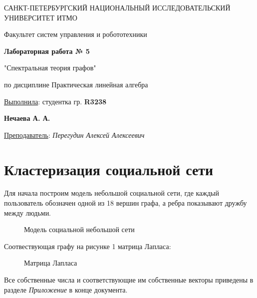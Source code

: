 \documentclass[a5paper, 10pt]{article}
\theoremstyle{definition}
\theoremstyle{plain}
\theoremstyle{remark}
\newcommand*{\titlePage}{
	\thispagestyle{title}
	\begingroup
	\begin{center}
		\vspace*{6ex}
		
		{\small
			САНКТ-ПЕТЕРБУРГСКИЙ НАЦИОНАЛЬНЫЙ ИССЛЕДОВАТЕЛЬСКИЙ УНИВЕРСИТЕТ ИТМО	
		}
		
		\vspace*{2ex}
		
		{\normalsize
			Факультет систем управления и робототехники
		}
		
		\vspace*{15ex}
		
		{\Large \bfseries 
			Лабораторная работа № 5
		}
\vspace*{2ex}
	{\Large \bfseries 
			
"Спектральная теория графов"
		}
\vspace*{2ex}
		
		{\normalsize
			по дисциплине Практическая линейная алгебра
		}

	\end{center}
	\vspace*{20ex}
	\begin{flushright}
		{\large 
			\underline{Выполнила}: студентка гр. \textbf{R3238}\\
			\begin{flushright}
				\textbf{Нечаева А. А.}\\
			\end{flushright}
		}
		
		\vspace*{5ex}
		
		{\large 
			\underline{Преподаватель}: \textit{Перегудин Алексей Алексеевич}
		}
	\end{flushright}	
	\newpage
	\setcounter{page}{1}
	\endgroup}
\begin{document}
	\titlePage
	\pagestyle{style}
\newpage
\section{Кластеризация социальной сети}
Для начала построим модель небольшой социальной сети, где каждый пользователь обозначен одной из 18 вершин графа, а ребра показывают дружбу между людьми.

\begin{figure}[h!]
\caption{Модель социальной небольшой сети}
\end{figure}
Соотвествующая графу на рисунке 1 матрица Лапласа:
\begin{figure}[h!]
\caption{Матрица Лапласа}
\end{figure}
Все собственные числа и соответствующие им собственные векторы приведены в разделе \textit{Приложение} в конце документа.\\
\end{document}

